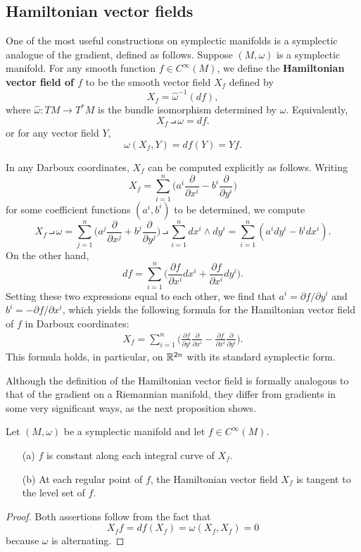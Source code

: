 \subsection{Hamiltonian vector fields}
One of the most useful constructions on symplectic manifolds is a symplectic analogue of the gradient, defined as follows. Suppose $(M,\omega)$ is a symplectic manifold. For any smooth function $f\in C^\infty(M)$, we define the \textbf{Hamiltonian vector field of $f$} to be the smooth vector field $X_f$ defined by
\[X_f=\widehat{\omega}^{-1}(df),\]
where $\widehat{\omega}:TM\to T^*M$ is the bundle isomorphism determined by $\omega$. Equivalently,
\[X_f\intprod \omega=df.\]
or for any vector field $Y$,
\[\omega(X_f,Y)=df(Y)=Yf.\]

In any Darboux coordinates, $X_f$ can be computed explicitly as follows. Writing
\[X_f=\sum_{i=1}^{n}\Big(a^i\frac{\partial}{\partial x^i}-b^i\frac{\partial}{\partial y^i}\Big)\]
for some coefficient functions $(a^i,b^i)$ to be determined, we compute
\[X_f\intprod\omega=\sum_{j=1}^{n}\Big(a^j\frac{\partial}{\partial x^j}+b^j\frac{\partial}{\partial y^j}\Big)\intprod\sum_{i=1}^{n}dx^i\wedge dy^i=\sum_{i=1}^{n}(a^idy^i-b^idx^i).\]
On the other hand,
\[df=\sum_{i=1}^{n}\Big(\frac{\partial f}{\partial x^i}dx^i+\frac{\partial f}{\partial x^i}dy^i\Big).\]
Setting these two expressions equal to each other, we find that $a^i=\partial f/\partial y^i$ and $b^i=-\partial f/\partial x^i$, which yields the following formula for the Hamiltonian vector field of $f$ in Darboux coordinates:
\begin{align}\label{Hamiltonian vector field}
X_f=\sum_{i=1}^{n}\Big(\frac{\partial f}{\partial y^i}\frac{\partial}{\partial x^i}-\frac{\partial f}{\partial x^i}\frac{\partial}{\partial y^i}\Big).
\end{align}
This formula holds, in particular, on $\mathbb{R}^{2n}$ with its standard symplectic form.\par
Although the definition of the Hamiltonian vector field is formally analogous to that of the gradient on a Riemannian manifold, they differ from gradients in some very significant ways, as the next proposition shows.

\begin{proposition}\label{Hamiltonian vector field prop}
Let $(M,\omega)$ be a symplectic manifold and let $f\in C^\infty(M)$.
\begin{enumerate}
\item[(a)] $f$ is constant along each integral curve of $X_f$.
\item[(b)] At each regular point of $f$, the Hamiltonian vector field $X_f$ is tangent to the level set of $f$.
\end{enumerate}
\end{proposition}
\begin{proof}
Both assertions follow from the fact that
\[X_ff=df(X_f)=\omega(X_f,X_f)=0\]
because $\omega$ is alternating.
\end{proof}


